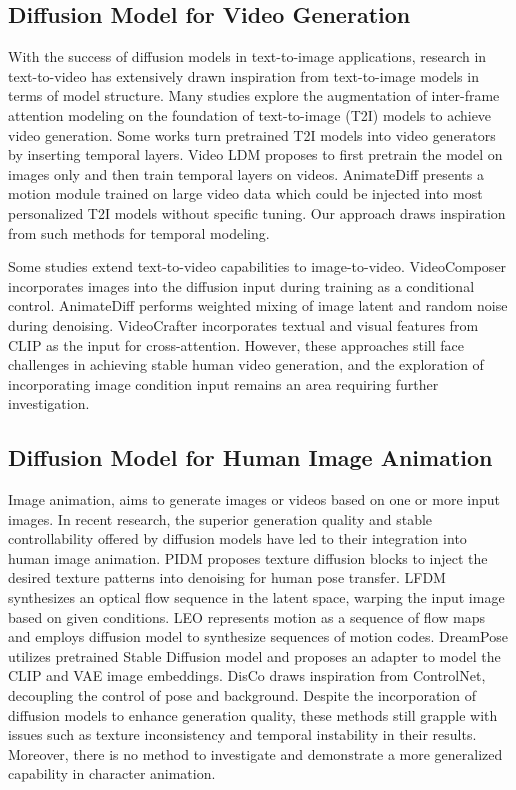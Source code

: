 \subsection{Diffusion Model for Video Generation }
With the success of diffusion models in text-to-image applications, research in text-to-video has extensively drawn inspiration from text-to-image models in terms of model structure. 
Many studies\cite{text2videozero,fatezero,cogvideo,tuneavideo,rerender,gen1,followyourpose,makeavideo,vdm} explore the augmentation of inter-frame attention modeling on the foundation of text-to-image (T2I) models to achieve video generation.
Some works turn pretrained T2I models into video generators by inserting temporal layers. Video LDM\cite{align} proposes to first pretrain the model on images only and then train temporal layers on videos. AnimateDiff\cite{animatediff} presents a motion module trained on large video data which could be injected into most personalized T2I models without specific tuning. Our approach draws inspiration from such methods for temporal modeling. 

Some studies extend text-to-video capabilities to image-to-video.
VideoComposer\cite{videocomposer} incorporates images into the diffusion input during training as a conditional control. AnimateDiff\cite{animatediff} performs weighted mixing of image latent and random noise during denoising. VideoCrafter\cite{videocrafter1} incorporates textual and visual features from CLIP as the input for cross-attention. 
However, these approaches still face challenges in achieving stable human video generation, and the exploration of incorporating image condition input remains an area requiring further investigation.

\subsection{Diffusion Model for Human Image Animation }
Image animation\cite{fomm,mraa,ren2020deep,tpsmm,siarohin2019animating,zhang2022exploring,bidirectionally,everybody,liquid,editable}, aims to generate images or videos based on one or more input images. 
In recent research, the superior generation quality and stable controllability offered by diffusion models have led to their integration into human image animation. PIDM\cite{pidm} proposes texture diffusion blocks to inject the desired texture patterns into denoising for human pose transfer. LFDM\cite{LFDM} synthesizes an optical flow sequence in the latent space, warping the input image based on given conditions. LEO\cite{leo} represents motion as a sequence of flow maps and employs diffusion model to synthesize sequences of motion codes. DreamPose\cite{dreampose} utilizes pretrained Stable Diffusion model and proposes an adapter to model the CLIP and VAE image embeddings. DisCo\cite{disco} draws inspiration from ControlNet, decoupling the control of pose and background. Despite the incorporation of diffusion models to enhance generation quality, these methods still grapple with issues such as texture inconsistency and temporal instability in their results. Moreover, there is no method to investigate and demonstrate a more generalized capability in character animation.


